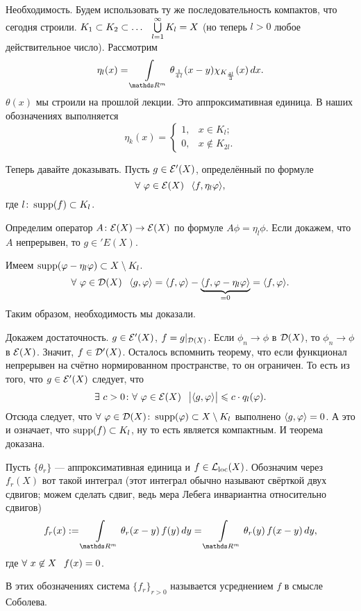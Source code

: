 \begin{Proof}
	Необходимость. Будем использовать ту же последовательность компактов, что сегодня строили. $K_1\subset K_2\subset\dots\pau \uN l1 K_l=X$ (но теперь $l>0$ любое действительное число). Рассмотрим
	\[
		\eta_l(x) = \Gint{\R^m}\theta_{\frac1{4\,l}}(x-y)\chi_{K_{\frac{4l}3}}(x)\,dx.
	\]
	$\theta(x)$ мы строили на прошлой лекции. Это аппроксимативная единица. В наших обозначениях выполняется
	\[
  \eta_k(x) = \begin{cases}
	  1,&x\in K_l;\\
	  0,&x\not\in K_{2l}.
  \end{cases}
	\]

	Теперь давайте доказывать. Пусть $g\in \mathcal E'(X)$, определённый по формуле
	\[
 \forall\ \phi\in\E(X)\pau \la f,\eta_l\phi\ra,
	\]
	где $l\colon \operatorname{supp}(f)\subset K_l$.

	Определим оператор $A\colon \mathcal E(X)\rightarrow\mathcal E(X)$ по формуле $A\phi = \eta_l\phi$. Если докажем, что $A$ непрерывен, то $g\in 'E(X)$.

	Имеем $\operatorname{supp}(\varphi-\eta_l\varphi)\subset X\setminus K_l$.
\[
\forall\ \varphi\in\mathcal D(X)\hskip .75em plus.1em minus.08em\relax  \langle g,\varphi\rangle = \langle f,\varphi\rangle - \underbrace{\langle f,\varphi-\eta_l\varphi\rangle}_{=0} = \langle f,\varphi\rangle.
\]
Таким образом, необходимость мы доказали.

Докажем достаточность. $g\in \mathcal E'(X)$, $f = g|_{\mathcal D(X)}$. Если $\phi_n\to\phi$ в $\mathcal D(X)$, то $\phi_n\to\phi$ в $\mathcal E(X)$. Значит, $f\in\mathcal D'(X)$. 
Осталось вспомнить теорему, что если функционал непрерывен на счётно нормированном пространстве, то он ограничен. То есть из того, что $g\in\mathcal E'(X)$ следует, что
\[
  \exists\ c>0\colon \forall\ \varphi\in\mathcal E(X)\hskip .75em plus.1em minus.08em\relax \big|\langle g,\varphi\rangle\big|\leqslant c\cdot q_l(\varphi).
\]
Отсюда следует, что $\forall\ \varphi\in\mathcal D(X)\colon \operatorname{supp}(\varphi)\subset X\setminus K_l$ выполнено $\langle g,\varphi\rangle = 0$. А это и означает, что $\operatorname{supp}(f)\subset K_l$, ну то есть является компактным. И теорема доказана.
\end{Proof}
\begin{Def}
	Пусть $\{\theta_r\}$ --- аппроксимативная единица и $f\in \mathcal L_{\mathrm{loc}}(X)$. Обозначим через $f_r(X)$ вот такой интеграл (этот интеграл обычно называют свёрткой двух сдвигов; можем сделать сдвиг, ведь мера Лебега инвариантна относительно сдвигов)
	\[
		f_r(x) := \Gint{\R^m}\theta_r(x-y)\,f(y)\,dy = 
		\Gint{\R^m}\theta_r(y)\,f(x-y)\,dy,
	\]
	где $\forall\ x\not\in X\pau f(x)=0$.

	В этих обозначениях система $\{f_r\}_{r>0}$ называется усреднением $f$ в смысле Соболева.
\end{Def}

